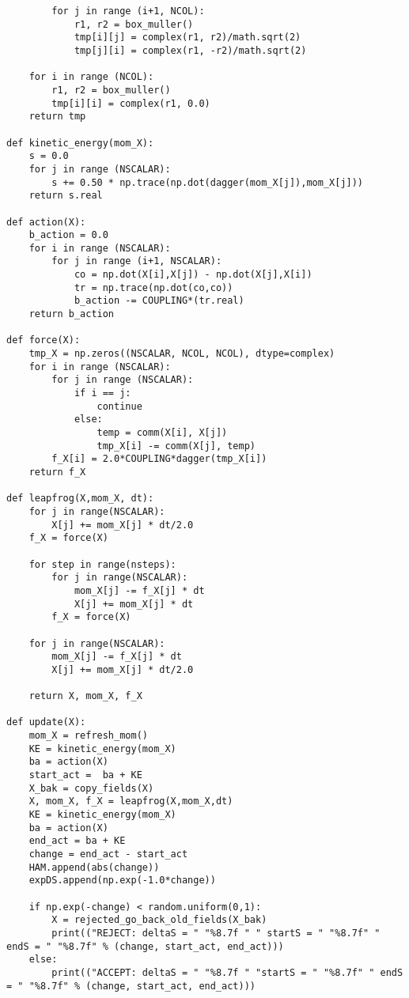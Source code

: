\begin{lstlisting}
        for j in range (i+1, NCOL):
            r1, r2 = box_muller()
            tmp[i][j] = complex(r1, r2)/math.sqrt(2)
            tmp[j][i] = complex(r1, -r2)/math.sqrt(2)

    for i in range (NCOL):
        r1, r2 = box_muller()
        tmp[i][i] = complex(r1, 0.0)
    return tmp 

def kinetic_energy(mom_X):
    s = 0.0 
    for j in range (NSCALAR):
        s += 0.50 * np.trace(np.dot(dagger(mom_X[j]),mom_X[j]))
    return s.real    

def action(X):
    b_action = 0.0 
    for i in range (NSCALAR):
        for j in range (i+1, NSCALAR): 
            co = np.dot(X[i],X[j]) - np.dot(X[j],X[i])
            tr = np.trace(np.dot(co,co))
            b_action -= COUPLING*(tr.real) 
    return b_action

def force(X):
    tmp_X = np.zeros((NSCALAR, NCOL, NCOL), dtype=complex)
    for i in range (NSCALAR): 
        for j in range (NSCALAR):
            if i == j:
                continue 
            else:
                temp = comm(X[i], X[j])
                tmp_X[i] -= comm(X[j], temp)
        f_X[i] = 2.0*COUPLING*dagger(tmp_X[i])
    return f_X 

def leapfrog(X,mom_X, dt):
    for j in range(NSCALAR):
        X[j] += mom_X[j] * dt/2.0
    f_X = force(X)

    for step in range(nsteps):
        for j in range(NSCALAR):
            mom_X[j] -= f_X[j] * dt
            X[j] += mom_X[j] * dt
        f_X = force(X)

    for j in range(NSCALAR):
        mom_X[j] -= f_X[j] * dt
        X[j] += mom_X[j] * dt/2.0
    
    return X, mom_X, f_X

def update(X):
    mom_X = refresh_mom()
    KE = kinetic_energy(mom_X)
    ba = action(X)
    start_act =  ba + KE
    X_bak = copy_fields(X) 
    X, mom_X, f_X = leapfrog(X,mom_X,dt)
    KE = kinetic_energy(mom_X)
    ba = action(X)
    end_act = ba + KE
    change = end_act - start_act
    HAM.append(abs(change))
    expDS.append(np.exp(-1.0*change))   

    if np.exp(-change) < random.uniform(0,1):
        X = rejected_go_back_old_fields(X_bak)
        print(("REJECT: deltaS = " "%8.7f " " startS = " "%8.7f" " endS = " "%8.7f" % (change, start_act, end_act)))
    else:   
        print(("ACCEPT: deltaS = " "%8.7f " "startS = " "%8.7f" " endS = " "%8.7f" % (change, start_act, end_act)))


\end{lstlisting}
